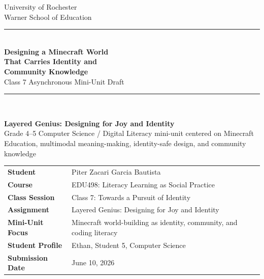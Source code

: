 \documentclass[11pt]{article}
\begin{document}
\begin{titlepage}
\thispagestyle{empty}

\begin{center}
{\large University of Rochester\\}
{\normalsize Warner School of Education\\[0.35in]}

{\color{PrimaryRed}\rule{\textwidth}{1.4pt}}\\[0.22in]
{\Huge\bfseries Designing a Minecraft World\\[0.08in] That Carries Identity and\\[0.08in] Community Knowledge}\\[0.18in]
{\Large Class 7 Asynchronous Mini-Unit Draft}\\[0.22in]
{\color{PrimaryRed}\rule{0.78\textwidth}{0.7pt}}\\[0.32in]

\colorbox{SoftBlue}{%
\parbox{0.88\textwidth}{%
\centering\vspace{0.12in}
\textbf{Layered Genius: Designing for Joy and Identity}\\[0.05in]
Grade 4--5 Computer Science / Digital Literacy mini-unit centered on Minecraft Education, multimodal meaning-making, identity-safe design, and community knowledge
\vspace{0.12in}
}%
}
\end{center}

\vspace{0.38in}

\begin{center}
\renewcommand{\arraystretch}{1.35}
\begin{tabular}{>{\bfseries\RaggedLeft}p{1.65in} p{4.9in}}
Student & Piter Zacari Garcia Bautista \\
Course & EDU498: Literacy Learning as Social Practice \\
Class Session & Class 7: Towards a Pursuit of Identity \\
Assignment & Layered Genius: Designing for Joy and Identity \\
Mini-Unit Focus & Minecraft world-building as identity, community, and coding literacy \\
Student Profile & Ethan, Student 5, Computer Science \\
Submission Date & June 10, 2026 \\
\end{tabular}
\end{center}


\end{titlepage}
\end{document}
